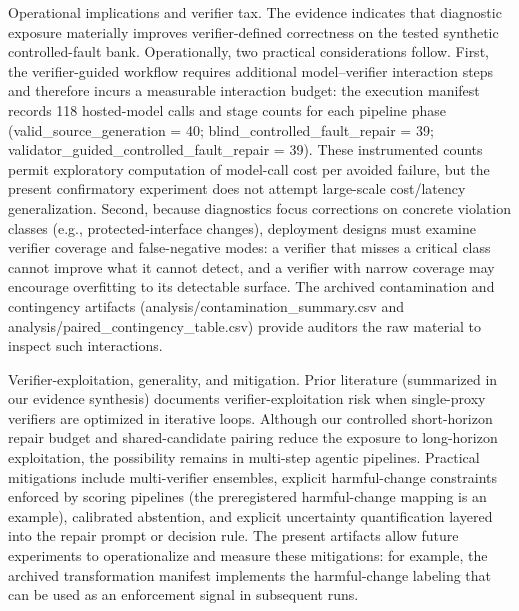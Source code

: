 \documentclass[conference]{IEEEtran}
\begin{document}
Operational implications and verifier tax. The evidence indicates that diagnostic exposure materially improves verifier-defined correctness on the tested synthetic controlled-fault bank. Operationally, two practical considerations follow. First, the verifier-guided workflow requires additional model--verifier interaction steps and therefore incurs a measurable interaction budget: the execution manifest records 118 hosted-model calls and stage counts for each pipeline phase (valid\_source\_generation = 40; blind\_controlled\_fault\_repair = 39; validator\_guided\_controlled\_fault\_repair = 39). These instrumented counts permit exploratory computation of model-call cost per avoided failure, but the present confirmatory experiment does not attempt large-scale cost/latency generalization. Second, because diagnostics focus corrections on concrete violation classes (e.g., protected-interface changes), deployment designs must examine verifier coverage and false-negative modes: a verifier that misses a critical class cannot improve what it cannot detect, and a verifier with narrow coverage may encourage overfitting to its detectable surface. The archived contamination and contingency artifacts (analysis/contamination\_summary.csv and analysis/paired\_contingency\_table.csv) provide auditors the raw material to inspect such interactions.

Verifier-exploitation, generality, and mitigation. Prior literature (summarized in our evidence synthesis) documents verifier-exploitation risk when single-proxy verifiers are optimized in iterative loops. Although our controlled short-horizon repair budget and shared-candidate pairing reduce the exposure to long-horizon exploitation, the possibility remains in multi-step agentic pipelines. Practical mitigations include multi-verifier ensembles, explicit harmful-change constraints enforced by scoring pipelines (the preregistered harmful-change mapping is an example), calibrated abstention, and explicit uncertainty quantification layered into the repair prompt or decision rule. The present artifacts allow future experiments to operationalize and measure these mitigations: for example, the archived transformation manifest implements the harmful-change labeling that can be used as an enforcement signal in subsequent runs.
\end{document}
